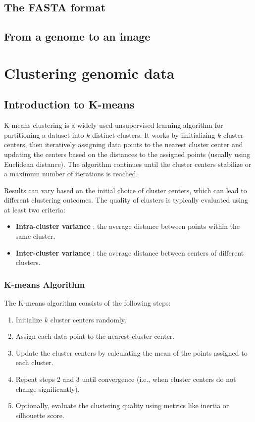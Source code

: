 \section{The FASTA format}
\label{sec:fasta_format}

\section{From a genome to an image}
\label{sec:genome_to_image}

\chapter{Clustering genomic data}
\label{chap:clustering_genomic_data}

\section{Introduction to K-means}
\label{sec:intro_kmeans}

K-means clustering is a widely used unsupervised learning algorithm for partitioning a dataset into $k$ distinct clusters.
It works by iinitializing $k$ cluster centers, then iteratively assigning data points to the nearest cluster center and 
updating the centers based on the distances to the assigned points (usually using Euclidean distance). The algorithm 
continues until the cluster centers stabilize or a maximum number of iterations is reached.

Results can vary based on the initial choice of cluster centers, which can lead to different clustering outcomes. 
The quality of clusters is typically evaluated using at least two criteria:

\begin{itemize}
	\item \textbf{Intra-cluster variance} : the average distance between points within the same cluster.
	\item \textbf{Inter-cluster variance} : the average distance between centers of different clusters.
\end{itemize}

\subsection{K-means Algorithm}
\label{subsec:kmeans_algorithm}

The K-means algorithm consists of the following steps:
\begin{enumerate}
	\item Initialize $k$ cluster centers randomly.
	\item Assign each data point to the nearest cluster center.
	\item Update the cluster centers by calculating the mean of the points assigned to each cluster.
	\item Repeat steps 2 and 3 until convergence (i.e., when cluster centers do not change significantly).
	\item Optionally, evaluate the clustering quality using metrics like inertia or silhouette score.
\end{enumerate}

